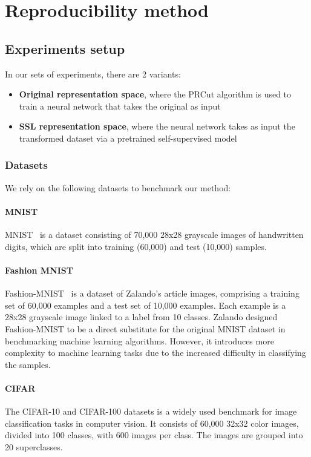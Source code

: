 \section{Reproducibility method}\label{appendix:experiments}

\subsection{ Experiments setup}
In our sets of experiments, there are 2 variants:
\begin{itemize}
	\item \textbf{Original representation space}, where the PRCut algorithm is used to train a neural
	      network that takes the original as input
	\item \textbf{SSL representation space}, where the neural network takes as input
	      the transformed dataset via a pretrained self-supervised model
\end{itemize}

\subsubsection{Datasets}
We rely on the following datasets to benchmark our method:
\paragraph{MNIST}
MNIST~\citep{mnist} is a dataset consisting of 70,000 28x28 grayscale images of
handwritten digits, which are split into training (60,000) and test (10,000)
samples.
\paragraph{Fashion MNIST}
Fashion-MNIST~\citep{fmnist} is a dataset of Zalando's article images, comprising a
training set of 60,000 examples and a test set of 10,000 examples. Each example is
a 28x28 grayscale image linked to a label from 10 classes. Zalando designed
Fashion-MNIST to be a direct substitute for the original MNIST dataset in
benchmarking machine learning algorithms. However, it introduces more complexity to
machine learning tasks due to the increased difficulty in classifying the samples.

\paragraph{CIFAR}
The CIFAR-10 and CIFAR-100 datasets\citep{cifar} is a widely used benchmark for
image classification tasks in computer vision. It consists of 60,000 32x32 color
images, divided into 100 classes, with 600 images per class. The images are grouped
into 20 superclasses.

